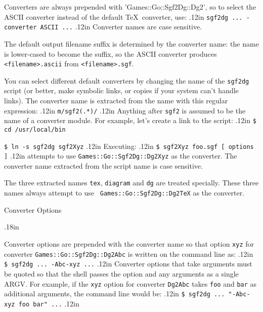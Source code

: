 Converters are always prepended with 'Games::Go::Sgf2Dg::Dg2', so to select
the ASCII converter instead of the default \TeX\ converter, use:
\vglue.12in
    {\tt sgf2dg ... -converter ASCII ...}
\vglue.12in
Converter names are case sensitive.

The default output filename suffix is determined by the converter name: the
name is lower-cased to become the suffix, so the ASCII converter produces
{\tt <filename>.ascii} from {\tt <filename>.sgf}.

You can select different default converters by changing the name of
the {\tt sgf2dg} script (or better, make symbolic links, or copies if
your system can't handle links).  The converter name is extracted
from the name with this regular expression:
\vglue.12in
    {\tt m/sgf2(.*)/}
\vglue.12in
Anything after {\tt sgf2} is assumed to be the name of a converter
module.  For example, let's create a link to the script:
\vglue.12in
    {\tt \$ cd /usr/local/bin}

    {\tt \$ ln -s sgf2dg sgf2Xyz}
\vglue.12in
Executing:
\vglue.12in
    {\tt \$ sgf2Xyz foo.sgf [ options ]}
\vglue.12in
\noindent
attempts to use {\tt Games::Go::Sgf2Dg::Dg2Xyz} as the converter.  The
converter name extracted from the script name is case sensitive.


The three extracted names {\tt tex}, {\tt diagram} and {\tt dg}
are treated specially. These three names always attempt to use {\tt
Games::Go::Sgf2Dg::Dg2TeX} as the converter.

% 
% 

\vfil\eject
\centerline{\titlefont Converter Options}
\vglue.18in

Converter options are prepended with the converter name so that
option {\tt xyz} for converter {\tt Games::Go::Sgf2Dg::Dg2Abc} is written on
the command line as:
\vglue.12in
    {\tt \$ sgf2dg ... -Abc-xyz ...}
\vglue.12in
Converter options that take arguments must be quoted so that the
shell passes the option and any arguments as a single ARGV.  For
example, if the {\tt xyz} option for converter {\tt Dg2Abc} takes {\tt foo} and
{\tt bar} as additional arguments, the command line would be:
\vglue.12in
    {\tt \$ sgf2dg ... "-Abc-xyz foo bar" ...}
\vglue.12in

